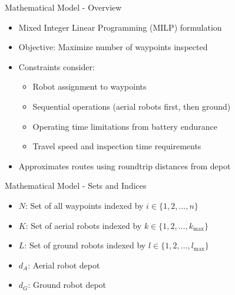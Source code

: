 \documentclass[aspectratio=169,11pt,xcolor={dvipsnames},hyperref={pdftex,pdfpagemode=UseNone,hidelinks,pdfdisplaydoctitle=true},usepdftitle=false]{beamer}
\begin{document}
  \begin{frame}{Mathematical Model - Overview}
    \begin{itemize}
      \item Mixed Integer Linear Programming (MILP) formulation
      \item Objective: Maximize number of waypoints inspected
      \item Constraints consider:
        \begin{itemize}
          \item Robot assignment to waypoints
          \item Sequential operations (aerial robots first, then ground)
          \item Operating time limitations from battery endurance
          \item Travel speed and inspection time requirements
        \end{itemize}
      \item Approximates routes using roundtrip distances from depot
    \end{itemize}
  \end{frame}

  \begin{frame}{Mathematical Model - Sets and Indices}
    \begin{itemize}
      \item $N$: Set of all waypoints indexed by $i \in \{1, 2, \ldots, n\}$
      \item $K$: Set of aerial robots indexed by $k \in \{1, 2, \ldots, k_{\max}\}$
      \item $L$: Set of ground robots indexed by $l \in \{1, 2, \ldots, l_{\max}\}$
      \item $d_A$: Aerial robot depot
      \item $d_G$: Ground robot depot
    \end{itemize}
  \end{frame}
\end{document}
